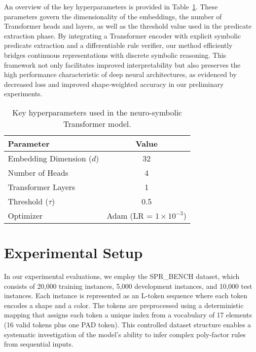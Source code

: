 \documentclass{article}
\begin{document}
An overview of the key hyperparameters is provided in Table~\ref{tab:hyperparams}. These parameters govern the dimensionality of the embeddings, the number of Transformer heads and layers, as well as the threshold value used in the predicate extraction phase. By integrating a Transformer encoder with explicit symbolic predicate extraction and a differentiable rule verifier, our method efficiently bridges continuous representations with discrete symbolic reasoning. This framework not only facilitates improved interpretability but also preserves the high performance characteristic of deep neural architectures, as evidenced by decreased loss and improved shape-weighted accuracy in our preliminary experiments.

\begin{table}[h]
\centering
\begin{tabular}{lc}
\hline
\textbf{Parameter} & \textbf{Value} \\
\hline
Embedding Dimension (\(d\)) & 32 \\
Number of Heads & 4 \\
Transformer Layers & 1 \\
Threshold (\(\tau\)) & 0.5 \\
Optimizer & Adam (LR = \(1 \times 10^{-3}\)) \\
\hline
\end{tabular}
\caption{Key hyperparameters used in the neuro-symbolic Transformer model.}
\label{tab:hyperparams}
\end{table}

\section{Experimental Setup}
In our experimental evaluations, we employ the SPR\_BENCH dataset, which consists of 20,000 training instances, 5,000 development instances, and 10,000 test instances. Each instance is represented as an L-token sequence where each token encodes a shape and a color. The tokens are preprocessed using a deterministic mapping that assigns each token a unique index from a vocabulary of 17 elements (16 valid tokens plus one PAD token). This controlled dataset structure enables a systematic investigation of the model’s ability to infer complex poly-factor rules from sequential inputs.
\end{document}

